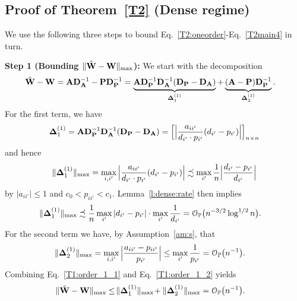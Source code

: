 \documentclass[10pt,journal,compsoc]{IEEEtran}
\newcommand{\op}{\mathcal{O}_{\mathbb{P}}}
\newcommand{\ee}{\end{aligned} \end{equation}}
\newcommand{\bee}{\begin{equation}\begin{aligned}}
\newcommand{\M}[1]{{{\mathbf{\MakeUppercase{#1}}}}}
\numberwithin{equation}{section}
\begin{document}
\subsection{Proof of Theorem~\ref{T2} (Dense regime)}\label{a:p:t2}
We use the following three steps to bound Eq.~\eqref{T2:oneorder}-Eq.~\eqref{T2main4} in turn.

\noindent\textbf{Step 1 (Bounding $\|\hat{\M W} - \M W\|_{\max}$):}
We start with the decomposition
\bee\label{T1:order_1_0}
\hat{\M W} - \M W &= \M A \M D_{\M A}^{-1} - \M P \M D_{\M P}^{-1} 
= \underbrace{\M A \M D_{\M P}^{-1} \M D_{\M A}^{-1}(\M D_{\M P} - \M D_{\M A})}_{\M \Delta^{(1)}_1} + \underbrace{(\M A - \M P)\M D_{\M P}^{-1}}_{\M \Delta^{(1)}_2}.
\ee
For the first term, we have
\begin{equation*}
\M \Delta^{(1)}_1 = \M A \M D_{\M P}^{-1} \M D_{\M A}^{-1}(\M D_{\M P} - \M D_{\M A}) = \Big[ \Big| \frac{a_{ii'}}{d_{i'} \cdot p_{i'}}(d_{i'} - p_{i'})\Big|\Big]_{n\times n}
\end{equation*}
and hence
\begin{equation*}
\| \M \Delta^{(1)}_1 \|_{\max} = \max_{i,i'} \Big| \frac{a_{ii'}}{d_{i'} \cdot p_{i'}}(d_{i'} - p_{i'})\Big| \precsim \max_{i'}\frac{1}{n}\Big| \frac{d_{i'} - p_{i'}}{d_{i'}}\Big|
\end{equation*}
by $|a_{ii'}| \leq 1$ and $c_0 <p_{ii'}<c_1$. Lemma~\ref{l:dense:rate}
then implies
\begin{equation}
\label{T1:order_1_1}
\begin{split}
\| \M \Delta^{(1)}_1 \|_{\max} &\precsim \frac{1}{n}\max_{i'}|d_{i'} - p_{i'}| \cdot \max_{i'}\frac{1}{d_{i'}} =
\op\big(n^{-3/2}\log^{1/2}{n}\big).
\end{split}
\end{equation}
For the second term we have, by Assumption~\ref{am:s}, that
\bee
\label{T1:order_1_2}
\|\M \Delta^{(1)}_2\|_{\max}  
&= \max_{i,{i'}}\Big| \frac{a_{ii'} - p_{ii'}}{p_{i'}}\Big| \leq \max_{i'} \frac{1}{p_{i'}} = \op\big(n^{-1}\big).
\ee
Combining Eq.~\eqref{T1:order_1_1} and Eq.~\eqref{T1:order_1_2} yields
\bee
\|\hat{\M W} - \M W\|_{\max}& \leq\!\|\M \Delta^{(1)}_1\|_{\max} \!+ \|\M
\Delta^{(1)}_2\|_{\max} 
= \op\big(n^{-1}\big).
\ee
\end{document}
